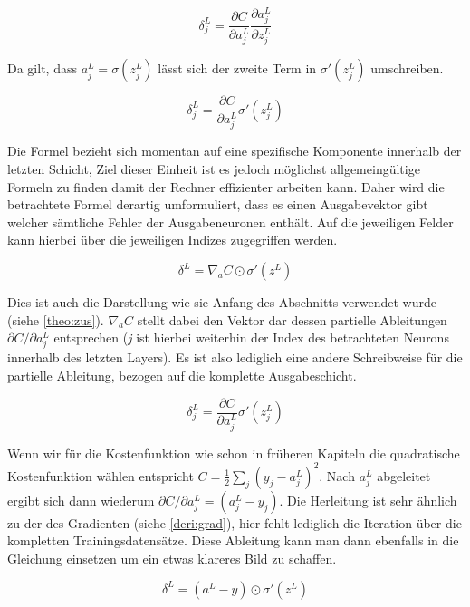 \begin{equation}
\delta^L_j = \frac{\partial C}{\partial a^L_j} \frac{\partial a^L_j}{\partial z^L_j}
\end{equation}

Da gilt, dass $a^L_j = \sigma(z^L_j)$ lässt sich der zweite Term in $\sigma'(z^L_j)$ umschreiben. 

\begin{equation}
\delta^L_j = \frac{\partial C}{\partial a^L_j} \sigma'(z^L_j)
\end{equation}

Die Formel bezieht sich momentan auf eine spezifische Komponente innerhalb der letzten Schicht, Ziel dieser Einheit ist es jedoch möglichst allgemeingültige Formeln zu finden damit der Rechner effizienter arbeiten kann. Daher wird die betrachtete Formel derartig umformuliert, dass es einen Ausgabevektor gibt welcher sämtliche Fehler der Ausgabeneuronen enthält. Auf die jeweiligen Felder kann hierbei über die jeweiligen Indizes zugegriffen werden. 

\begin{equation}
\delta^L = \nabla_a C \odot \sigma'(z^L)
\end{equation}

Dies ist auch die Darstellung wie sie Anfang des Abschnitts verwendet wurde (siehe \ref{theo:zus}). $\nabla_a C$ stellt dabei den Vektor dar dessen partielle Ableitungen $\partial C / \partial a^L_j$ entsprechen (\emph{j} ist hierbei weiterhin der Index des betrachteten Neurons innerhalb des letzten Layers). Es ist also lediglich eine andere Schreibweise für die partielle Ableitung, bezogen auf die komplette Ausgabeschicht. 

\begin{equation}
\delta^L_j = \frac{\partial C}{\partial a^L_j} \sigma'(z^L_j)
\end{equation}


Wenn wir für die Kostenfunktion wie schon in früheren Kapiteln die quadratische Kostenfunktion wählen entspricht $C = \frac{1}{2} \sum_j (y_j-a^L_j)^2$. Nach $a^L_j$ abgeleitet ergibt sich dann wiederum $\partial C / \partial a^L_j = (a_j^L-y_j)$. Die Herleitung ist sehr ähnlich zu der des Gradienten (siehe \ref{deri:grad}), hier fehlt lediglich die Iteration über die kompletten Trainingsdatensätze. Diese Ableitung kann man dann ebenfalls in die Gleichung einsetzen um ein etwas klareres Bild zu schaffen. 

\begin{equation}
\delta^L = (a^L-y) \odot \sigma'(z^L)
\end{equation}
 
